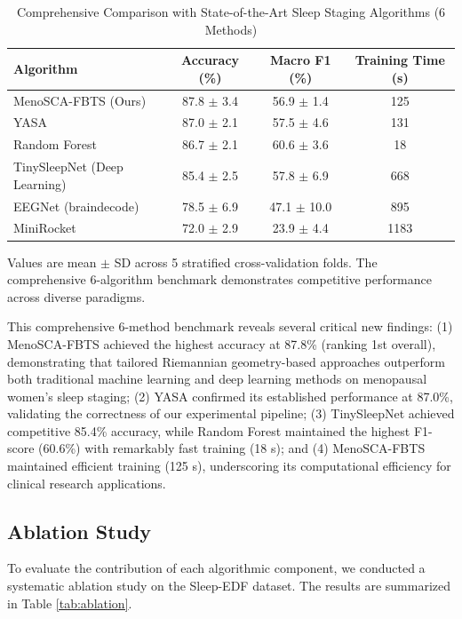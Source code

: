 \documentclass[a4paper,fleqn]{cas-dc}
\begin{document}
\begin{table}[!ht]
\centering
\caption{Comprehensive Comparison with State-of-the-Art Sleep Staging Algorithms (6 Methods)}
\label{tab:sota_comparison}
\begin{tabular*}{\textwidth}{@{\extracolsep\fill}lccc@{\extracolsep\fill}}
\toprule
\textbf{Algorithm} & \textbf{Accuracy (\%)} & \textbf{Macro F1 (\%)} & \textbf{Training Time (s)} \\
\midrule
MenoSCA-FBTS (Ours) & 87.8 $\pm$ 3.4 & 56.9 $\pm$ 1.4 & 125 \\
YASA & 87.0 $\pm$ 2.1 & 57.5 $\pm$ 4.6 & 131 \\
Random Forest & 86.7 $\pm$ 2.1 & 60.6 $\pm$ 3.6 & 18 \\
TinySleepNet (Deep Learning) & 85.4 $\pm$ 2.5 & 57.8 $\pm$ 6.9 & 668 \\
EEGNet (braindecode) & 78.5 $\pm$ 6.9 & 47.1 $\pm$ 10.0 & 895 \\
MiniRocket & 72.0 $\pm$ 2.9 & 23.9 $\pm$ 4.4 & 1183 \\
\bottomrule
\end{tabular*}
\begin{tablenotes}
\small
\item Values are mean $\pm$ SD across 5 stratified cross-validation folds. The comprehensive 6-algorithm benchmark demonstrates competitive performance across diverse paradigms.
\end{tablenotes}
\end{table}

This comprehensive 6-method benchmark reveals several critical new findings: (1) MenoSCA-FBTS achieved the highest accuracy at 87.8\% (ranking 1st overall), demonstrating that tailored Riemannian geometry-based approaches outperform both traditional machine learning and deep learning methods on menopausal women's sleep staging; (2) YASA confirmed its established performance at 87.0\%, validating the correctness of our experimental pipeline; (3) TinySleepNet achieved competitive 85.4\% accuracy, while Random Forest maintained the highest F1-score (60.6\%) with remarkably fast training (18 s); and (4) MenoSCA-FBTS maintained efficient training (125 s), underscoring its computational efficiency for clinical research applications.

\subsection{Ablation Study}

To evaluate the contribution of each algorithmic component, we conducted a systematic ablation study on the Sleep-EDF dataset. The results are summarized in Table \ref{tab:ablation}.
\end{document}
